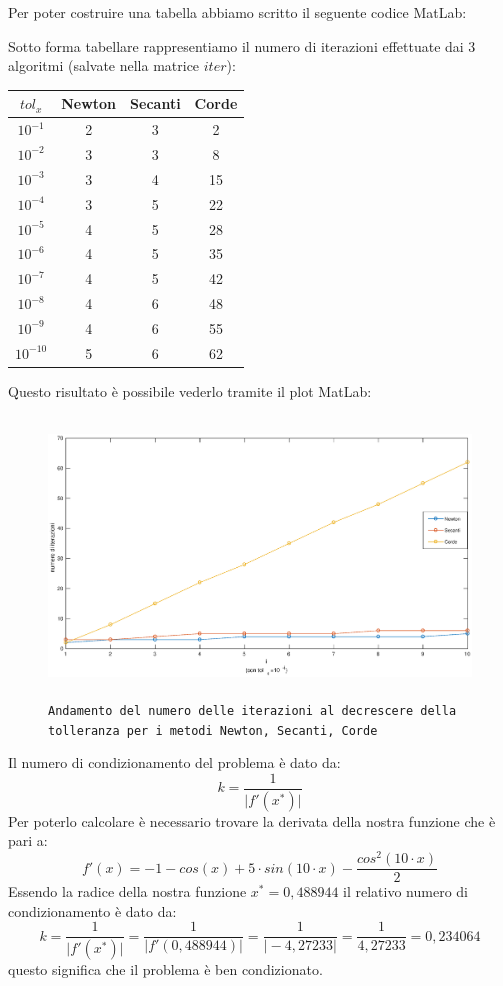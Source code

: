 \begin{flushleft}
Per poter costruire una tabella abbiamo scritto il seguente codice MatLab:



Sotto forma tabellare rappresentiamo il numero di iterazioni effettuate dai 3 algoritmi (salvate nella matrice $iter$):

\begin{center}
\begin{tabular}{|c|c|c|c|}
\hline
$tol_x$ & Newton & Secanti & Corde \\
\hline
$10^{-1}$ & 2 & 3 & 2 \\
$10^{-2}$ & 3 & 3 & 8 \\
$10^{-3}$ & 3 & 4 & 15 \\
$10^{-4}$ & 3 & 5 & 22 \\
$10^{-5}$ & 4 & 5 & 28 \\
$10^{-6}$ & 4 & 5 & 35 \\
$10^{-7}$ & 4 & 5 & 42 \\
$10^{-8}$ & 4 & 6 & 48 \\
$10^{-9}$ & 4 & 6 & 55 \\
$10^{-10}$ & 5 & 6 & 62 \\
\hline
\end{tabular}
\end{center}
Questo risultato è possibile vederlo tramite il plot MatLab:
\begin{figure}[H]
\label{fes26}
\includegraphics[width=480px, height=280px]{plot/fes26}
\caption{\texttt{\texttt{Andamento del numero delle iterazioni al decrescere della tolleranza per i metodi Newton, Secanti, Corde}}}
\end{figure}
Il numero di condizionamento del problema è dato da:
\[
k = \frac{1}{\big|f'(x^*)\big|}
\]
Per poterlo calcolare è necessario trovare la derivata della nostra funzione che è pari a:
\[
f'(x) = -1 - cos(x) + 5 \cdot sin(10\cdot x) - \frac{cos^2(10\cdot x)}{2}
\]
Essendo la radice della nostra funzione  $x^* = 0,488944$ il relativo numero di condizionamento è dato da:
\[
k = \frac{1}{\Big|f'(x^*)\Big|} = \frac{1}{\Big|f'(0,488944)\Big|} = \frac{1}{\Big|-4,27233\Big|} = \frac{1}{4,27233} = 0,234064
\]
questo significa che il problema è ben condizionato.
\end{flushleft}